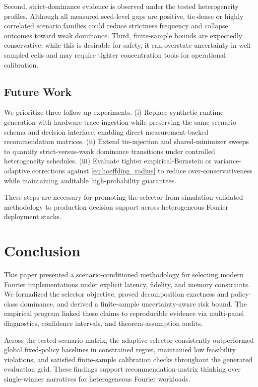 \documentclass{article} %
\begin{document}
Second, strict-dominance evidence is observed under the tested heterogeneity profiles. Although all measured seed-level gaps are positive, tie-dense or highly correlated scenario families could reduce strictness frequency and collapse outcomes toward weak dominance. Third, finite-sample bounds are expectedly conservative; while this is desirable for safety, it can overstate uncertainty in well-sampled cells and may require tighter concentration tools for operational calibration.

\subsection{Future Work}
We prioritize three follow-up experiments. (i) Replace synthetic runtime generation with hardware-trace ingestion while preserving the same scenario schema and decision interface, enabling direct measurement-backed recommendation matrices. (ii) Extend tie-injection and shared-minimizer sweeps to quantify strict-versus-weak dominance transitions under controlled heterogeneity schedules. (iii) Evaluate tighter empirical-Bernstein or variance-adaptive corrections against \eqref{eq:hoeffding_radius} to reduce over-conservativeness while maintaining auditable high-probability guarantees.

These steps are necessary for promoting the selector from simulation-validated methodology to production decision support across heterogeneous Fourier deployment stacks.

\section{Conclusion}
This paper presented a scenario-conditioned methodology for selecting modern Fourier implementations under explicit latency, fidelity, and memory constraints. We formalized the selector objective, proved decomposition exactness and policy-class dominance, and derived a finite-sample uncertainty-aware risk bound. The empirical program linked these claims to reproducible evidence via multi-panel diagnostics, confidence intervals, and theorem-assumption audits.

Across the tested scenario matrix, the adaptive selector consistently outperformed global fixed-policy baselines in constrained regret, maintained low feasibility violations, and satisfied finite-sample calibration checks throughout the generated evaluation grid. These findings support recommendation-matrix thinking over single-winner narratives for heterogeneous Fourier workloads.
\end{document}
